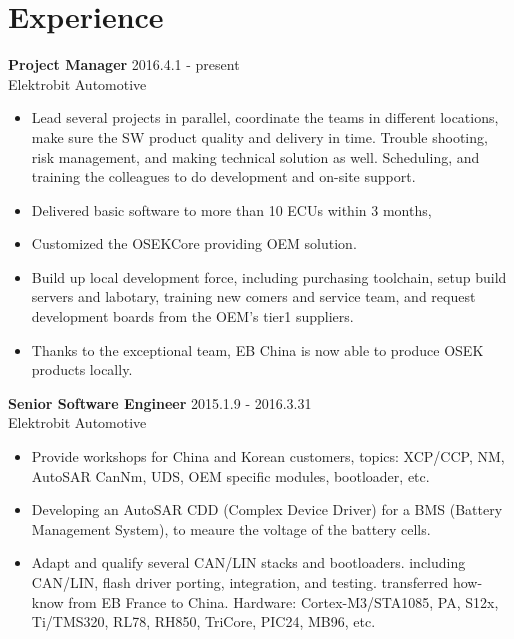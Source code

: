 
\section{Experience}
\textbf{Project Manager} \hfill 2016.4.1 - present \\
        Elektrobit Automotive
        \begin{itemize}  \itemsep -2pt %
        \item Lead several projects in parallel, coordinate the teams in different locations,
            make sure the SW product quality and delivery in time.
            Trouble shooting, risk management, and making technical solution as well.
            Scheduling, and training the colleagues to do development and on-site support.
        \item Delivered basic software to more than 10 ECUs within 3 months,
        \item Customized the OSEKCore providing OEM solution.
        \item Build up local development force,
        including purchasing toolchain,
        setup build servers and labotary,
        training new comers and service team,
        and request development boards from the OEM's tier1 suppliers.
        \item Thanks to the exceptional team,
            EB China is now able to produce OSEK products locally.
        \end{itemize}

\textbf{Senior Software Engineer} \hfill 2015.1.9 - 2016.3.31 \\
        Elektrobit Automotive
        \begin{itemize}  \itemsep -2pt %
        \item Provide workshops for China and Korean customers,
            topics:
            XCP/CCP, NM, AutoSAR CanNm, UDS, OEM specific modules, bootloader, etc.
        \item Developing an AutoSAR CDD (Complex Device Driver) for a BMS (Battery Management System),
            to meaure the voltage of the battery cells.
        \item Adapt and qualify several CAN/LIN stacks and bootloaders.
            including CAN/LIN, flash driver porting, integration, and testing.
            transferred how-know from EB France to China.
            Hardware: Cortex-M3/STA1085, PA, S12x, Ti/TMS320, RL78, RH850, TriCore, PIC24, MB96, etc.
        \end{itemize}


